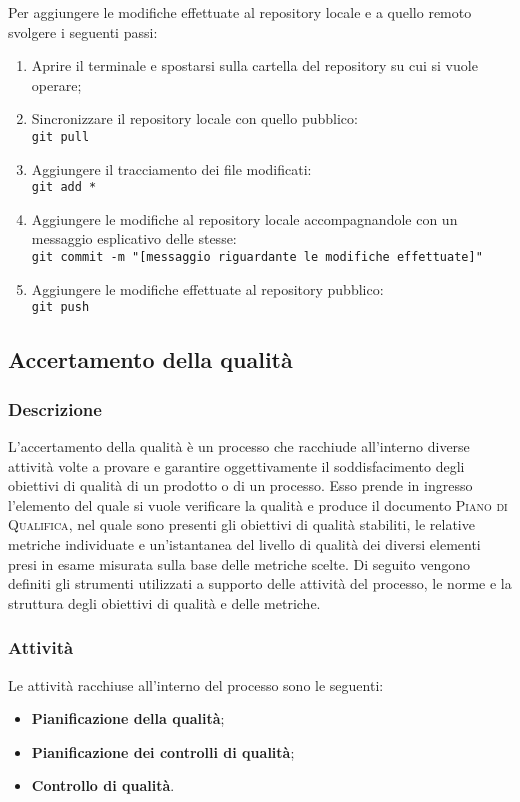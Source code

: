 Per aggiungere le modifiche effettuate al repository locale e a quello remoto svolgere i seguenti passi:
\begin{enumerate}
	\item Aprire il terminale e spostarsi sulla cartella del repository su cui si vuole operare;
	\item Sincronizzare il repository locale con quello pubblico:\\
		\texttt{git pull}
	\item Aggiungere il tracciamento dei file modificati:\\
		\texttt{git add *}
	\item Aggiungere le modifiche al repository locale accompagnandole con un messaggio esplicativo delle stesse:\\
		\texttt{git commit -m "[messaggio riguardante le modifiche effettuate]"}
	\item Aggiungere le modifiche effettuate al repository pubblico:\\
		\texttt{git push}
\end{enumerate}

\subsection{Accertamento della qualità}
\label{sub:accertamento_qualita}

\subsubsection{Descrizione}
L'accertamento della qualità è un processo che racchiude all'interno diverse attività volte a provare e garantire oggettivamente il 
soddisfacimento degli obiettivi di qualità di un prodotto o di un processo. Esso prende in ingresso l'elemento del quale si vuole 
verificare la qualità e produce il documento \textsc{Piano di Qualifica}, nel quale sono presenti gli obiettivi di qualità stabiliti, le 
relative metriche individuate e un'istantanea del livello di qualità dei diversi elementi presi in esame misurata sulla base delle metriche scelte.
Di seguito vengono definiti gli strumenti utilizzati a supporto delle attività del processo, le norme e la struttura degli obiettivi di qualità e delle metriche.

\subsubsection{Attività}
Le attività racchiuse all'interno del processo sono le seguenti:
\begin{itemize}
    \item \textbf{Pianificazione della qualità};
    \item \textbf{Pianificazione dei controlli di qualità};
    \item \textbf{Controllo di qualità}.
\end{itemize}

